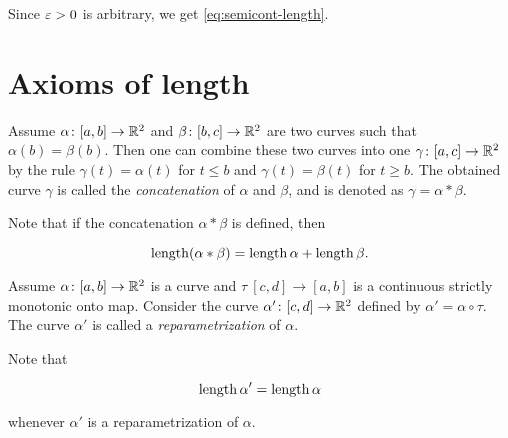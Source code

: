 Since $\varepsilon>0$ is arbitrary, we get \ref{eq:semicont-length}.\qeds%



\section{Axioms of length}



Assume $\alpha\colon[a,b]\to \mathbb{R}^2$ and $\beta\:[b,c]\z\to \RR^2$ are two curves such that $\alpha(b)=\beta(b)$.
Then one can combine these two curves into one $\gamma\:[a,c]\z\to \RR^2$ by the rule $\gamma(t)=\alpha(t)$ for $t\le b$ and $\gamma(t)=\beta(t)$ for $t\ge b$.
The obtained curve $\gamma$ is called the 
\emph{concatenation} of $\alpha$ and $\beta$, and is denoted as $\gamma=\alpha*\beta$.

Note that if the concatenation $\alpha*\beta$ is defined, then

\[\mathop{\rm length}\nolimits(\alpha*\beta)=\mathop{\rm length}\nolimits\alpha+\mathop{\rm length}\nolimits\beta.\]



Assume $\alpha\colon[a,b]\to \mathbb{R}^2$ is a curve and $\tau\:[c,d]\to [a,b]$ is a continuous strictly monotonic onto map.
Consider the curve $\alpha'\colon[c,d]\to \mathbb{R}^2$ defined by $\alpha'=\alpha\circ\tau$.
The curve $\alpha'$ is called a \emph{reparametrization} of $\alpha$.

Note that 

\[\mathop{\rm length}\nolimits\alpha'=\mathop{\rm length}\nolimits\alpha\]

whenever $\alpha'$ is a reparametrization of $\alpha$.









